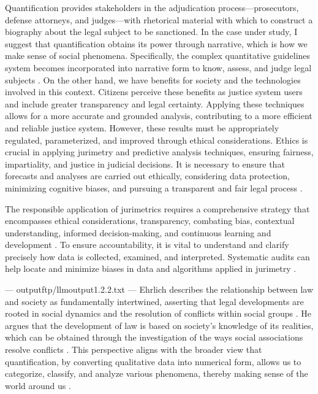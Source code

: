 Quantification provides stakeholders in the adjudication process—prosecutors, defense attorneys, and judges—with rhetorical material with which to construct a biography about the legal subject to be sanctioned. In the case under study, I suggest that quantification obtains its power through narrative, which is how we make sense of social phenomena. Specifically, the complex quantitative guidelines system becomes incorporated into narrative form to know, assess, and judge legal subjects \cite{101111lsi12334}. On the other hand, we have benefits for society and the technologies involved in this context. Citizens perceive these benefits as justice system users and include greater transparency and legal certainty. Applying these techniques allows for a more accurate and grounded analysis, contributing to a more efficient and reliable justice system. However, these results must be appropriately regulated, parameterized, and improved through ethical considerations. Ethics is crucial in applying jurimetry and predictive analysis techniques, ensuring fairness, impartiality, and justice in judicial decisions. It is necessary to ensure that forecasts and analyses are carried out ethically, considering data protection, minimizing cognitive biases, and pursuing a transparent and fair legal process \cite{101007s1102402209481w}.

The responsible application of jurimetrics requires a comprehensive strategy that encompasses ethical considerations, transparency, combating bias, contextual understanding, informed decision-making, and continuous learning and development \cite{10.1590/dados.2022.65.3.267,inthelawviewmetadatacitationsimilarpapers2014}. To ensure accountability, it is vital to understand and clarify precisely how data is collected, examined, and interpreted. Systematic audits can help locate and minimize biases in data and algorithms applied in jurimetry \cite{10.1590/dados.2022.65.3.267,inthelawviewmetadatacitationsimilarpapers2014}.


---
outputftp/llmoutput1.2.2.txt
---
Ehrlich describes the relationship between law and society as fundamentally intertwined, asserting that legal developments are rooted in social dynamics and the resolution of conflicts within social groups \cite{ehrlich1967fundamentos}. He argues that the development of law is based on society's knowledge of its realities, which can be obtained through the investigation of the ways social associations resolve conflicts \cite{ehrlich1967fundamentos}. This perspective aligns with the broader view that quantification, by converting qualitative data into numerical form, allows us to categorize, classify, and analyze various phenomena, thereby making sense of the world around us \cite{10.1590/dados.2022.65.3.267,10.1080/07329113.2015.1046739}.

